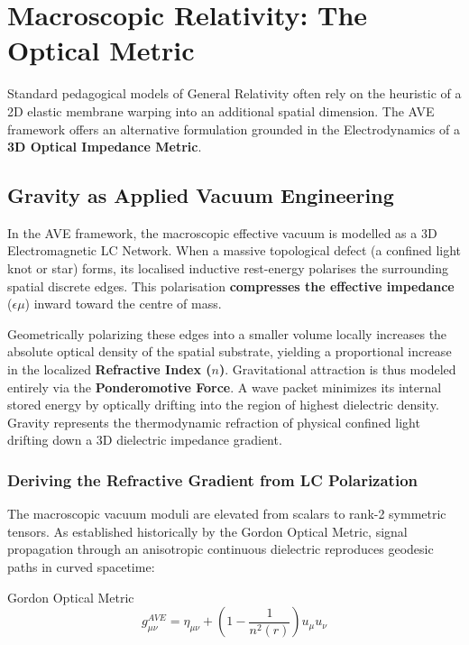 \chapter{Macroscopic Relativity: The Optical Metric}
\label{ch:relativity}

Standard pedagogical models of General Relativity often rely on the heuristic of a 2D elastic membrane warping into an additional spatial dimension. The AVE framework offers an alternative formulation grounded in the Electrodynamics of a \textbf{3D Optical Impedance Metric}.

\section{Gravity as Applied Vacuum Engineering}
In the AVE framework, the macroscopic effective vacuum is modelled as a 3D Electromagnetic LC Network. When a massive topological defect (a confined light knot or star) forms, its localised inductive rest-energy polarises the surrounding spatial discrete edges. This polarisation \textbf{compresses the effective impedance} ($\epsilon\mu$) inward toward the centre of mass.

Geometrically polarizing these edges into a smaller volume locally increases the absolute optical density of the spatial substrate, yielding a proportional increase in the localized \textbf{Refractive Index ($n$)}. Gravitational attraction is thus modeled entirely via the \textbf{Ponderomotive Force}. A wave packet minimizes its internal stored energy by optically drifting into the region of highest dielectric density. Gravity represents the thermodynamic refraction of physical confined light drifting down a 3D dielectric impedance gradient.

\subsection{Deriving the Refractive Gradient from LC Polarization}

The macroscopic vacuum moduli are elevated from scalars to rank-2 symmetric tensors. As
established historically by the Gordon Optical Metric, signal propagation through an
anisotropic continuous dielectric reproduces geodesic paths in curved spacetime:

\begin{resultbox}{Gordon Optical Metric}
\begin{equation}
g_{\mu\nu}^{AVE}=\eta_{\mu\nu}+\left(1-\frac{1}{n^{2}(r)}\right)u_{\mu}u_{\nu}
\end{equation}
\end{resultbox}


